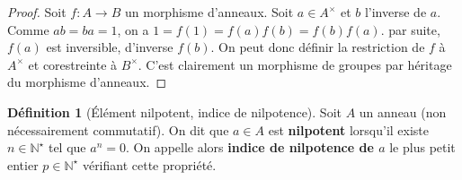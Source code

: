 \documentclass[french]{book}
\newcommand{\N}{\mathbb{N}}
\newcommand{\st}{^\star}
\theoremstyle{plain}
\theoremstyle{definition}
\newtheorem{dfn}{Définition}[chapter]
\theoremstyle{remark}
\begin{document}
\begin{proof}
	Soit $f:A\rightarrow B$ un morphisme d'anneaux. Soit $a\in A^\times$ et $b$ l'inverse de $a$. Comme $ab=ba=1$, on a $1=f(1)=f(a)f(b)=f(b)f(a)$. par suite, $f(a)$ est inversible, d'inverse $f(b)$. On peut donc définir la restriction de $f$ à $A^\times$ et corestreinte à $B^\times$. C'est clairement un morphisme de groupes par héritage du morphisme d'anneaux.
\end{proof}
\begin{dfn}[Élément nilpotent, indice de nilpotence]
	Soit $A$ un anneau (non nécessairement commutatif). On dit que $a\in A$ est \textbf{nilpotent} lorsqu'il existe $n\in\N\st$ tel que $a^n=0$. On appelle alors \textbf{indice de nilpotence de $a$} le plus petit entier $p\in\N\st$ vérifiant cette propriété.
\end{dfn}
\end{document}
